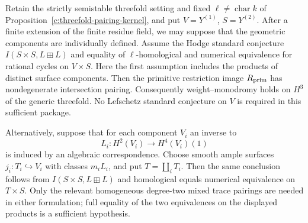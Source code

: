 \begin{proposition}
\label{c:threefold-target-positivity}
Retain the strictly semistable threefold setting and fixed
$\ell\ne\operatorname{char}k$ of
Proposition~\ref{c:threefold-pairing-kernel}, and put
$V=Y^{(1)}$, $S=Y^{(2)}$.
After a finite extension of the finite residue field, we may suppose
that the geometric components are individually defined.
Assume the Hodge standard conjecture
$I(S\times S,L\boxplus L)$ and equality of $\ell$-homological
and numerical equivalence for rational cycles on $V\times S$.
Here the first assumption includes the products of distinct surface
components. Then the primitive restriction image
$R_{\rm prim}$ has nondegenerate intersection pairing.
Consequently weight--monodromy holds on $H^3$ of the generic
threefold. No Lefschetz standard conjecture on $V$ is required
in this sufficient package.

Alternatively, suppose that for each component $V_i$ an inverse to
\[
 L_i:H^2(V_i)\longrightarrow H^4(V_i)(1)
\]
is induced by an algebraic correspondence.
Choose smooth ample surfaces $j_i:T_i\hookrightarrow V_i$ with
classes $m_iL_i$, and put $T=\coprod_iT_i$.
Then the same conclusion follows from
$I(S\times S,L\boxplus L)$ and
homological equals numerical equivalence on $T\times S$.
Only the relevant homogeneous degree-two mixed trace pairings
are needed in either formulation; full equality of the two
equivalences on the displayed products is a sufficient hypothesis.
\end{proposition}

